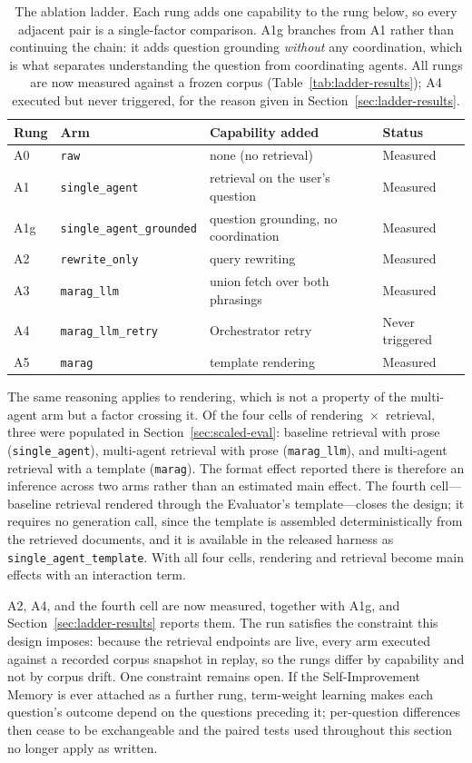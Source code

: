 \documentclass[acmsmall,review,anonymous,screen]{acmart}
\begin{document}
\begin{table}[t]
\caption{The ablation ladder. Each rung adds one capability to the rung below,
so every adjacent pair is a single-factor comparison. A1g branches from A1
rather than continuing the chain: it adds question grounding \emph{without}
any coordination, which is what separates understanding the question from
coordinating agents. All rungs are now measured against a frozen corpus
(Table~\ref{tab:ladder-results}); A4 executed but never triggered, for the
reason given in Section~\ref{sec:ladder-results}.}
\label{tab:ladder}
\begin{tabular}{llll}
\toprule
Rung & Arm & Capability added & Status \\
\midrule
A0 & \texttt{raw} & none (no retrieval) & Measured \\
A1 & \texttt{single\_agent} & retrieval on the user's question & Measured \\
A1g & \texttt{single\_agent\_grounded} & question grounding, no coordination & Measured \\
A2 & \texttt{rewrite\_only} & query rewriting & Measured \\
A3 & \texttt{marag\_llm} & union fetch over both phrasings & Measured \\
A4 & \texttt{marag\_llm\_retry} & Orchestrator retry & Never triggered \\
A5 & \texttt{marag} & template rendering & Measured \\
\bottomrule
\end{tabular}
\end{table}

The same reasoning applies to rendering, which is not a property of the
multi-agent arm but a factor crossing it. Of the four cells of
rendering~$\times$~retrieval, three were populated in
Section~\ref{sec:scaled-eval}: baseline retrieval with prose
(\texttt{single\_agent}), multi-agent retrieval with prose
(\texttt{marag\_llm}), and multi-agent retrieval with a template
(\texttt{marag}). The format effect reported there is therefore an inference
across two arms rather than an estimated main effect. The fourth cell---baseline
retrieval rendered through the Evaluator's template---closes the design; it
requires no generation call, since the template is assembled deterministically
from the retrieved documents, and it is available in the released harness as
\texttt{single\_agent\_template}. With all four cells, rendering and retrieval
become main effects with an interaction term.

A2, A4, and the fourth cell are now measured, together with A1g, and
Section~\ref{sec:ladder-results} reports them. The run satisfies the constraint
this design imposes: because the retrieval endpoints are live, every arm
executed against a recorded corpus snapshot in replay, so the rungs differ by
capability and not by corpus drift. One constraint remains open. If the
Self-Improvement Memory is ever attached as a further rung, term-weight
learning makes each question's outcome depend on the questions preceding it;
per-question differences then cease to be exchangeable and the paired tests
used throughout this section no longer apply as written.
\end{document}
